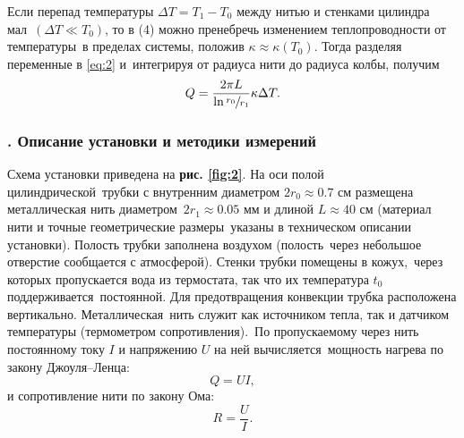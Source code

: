 \documentclass[a4paper, 12pt]{article}
\begin{document}
Если перепад температуры $\Delta T = T_1 - T_0$ между нитью и стенками цилиндра мал\
$(\Delta T \ll T_0)$, то в (4) можно пренебречь изменением теплопроводности от температуры\
в пределах системы, положив $\kappa \approx \kappa(T_0)$. Тогда разделяя переменные в \eqref{eq:2} и\
интегрируя от радиуса нити до радиуса колбы, получим
\begin{equation}
Q = \frac{2 \pi L}{\ln{\sfrac{r_0}{r_1}}}\kappa \Delta T.
\end{equation}

\subsubsection*{\Rnum{2}. Описание установки и методики измерений}

Схема установки приведена на \textbf{рис. \ref{fig:2}}. На оси полой цилиндрической\
трубки с внутренним диаметром $2r_0 \approx 0.7$ см размещена металлическая нить диаметром\
$2r_1 \approx 0.05$ мм и длиной $L \approx 40$ см (материал нити и точные геометрические размеры\
указаны в техническом описании установки). Полость трубки заполнена воздухом (полость\
через небольшое отверстие сообщается с атмосферой). Стенки трубки помещены в кожух,\
через которых пропускается вода из термостата, так что их температура $t_0$ поддерживается\
постоянной. Для предотвращения конвекции трубка расположена вертикально. Металлическая\
нить служит как источником тепла, так и датчиком температуры (термометром сопротивления).\
По пропускаемому через нить постоянному току $I$ и напряжению $U$ на ней вычисляется\
мощность нагрева по закону Джоуля–Ленца:
\begin{equation}
  Q = UI,
\end{equation}
и сопротивление нити по закону Ома:
\begin{equation}
  R = \frac{U}{I}.
\end{equation}
\end{document}
